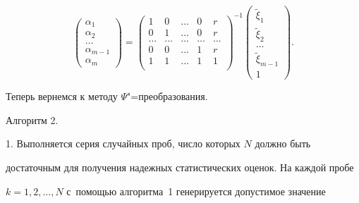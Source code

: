 \[

\begin{pmatrix}

\alpha _1  \\

\alpha _2  \\

\ldots \\

\alpha _{m-1} \\

\alpha _m

\end{pmatrix}=

\begin{pmatrix}

 1  & 0  & \ldots & 0  & r  \\

 0  & 1  & \ldots & 0  & r  \\

 \ldots & \ldots & \ldots & \ldots & \ldots \\

 0  & 0 & \ldots & 1  & r  \\

 1 & 1  & \ldots & 1  & 1 \\

\end{pmatrix}^{-1}

\begin{pmatrix}

\tilde {\xi }_1 \\

\tilde {\xi }_2  \\

\ldots \\

\tilde {\xi }_{m-1}\\

 1

\end{pmatrix}.

\]

Теперь вернемся к методу $\Psi$"=преобразования.



Алгоритм 2.



1. Выполняется серия случайных проб, число которых $N$ должно быть

достаточным для получения надежных статистических оценок. На каждой пробе

$k=1,2,\ldots,N$ с~помощью алгоритма~1 генерируется допустимое значение

